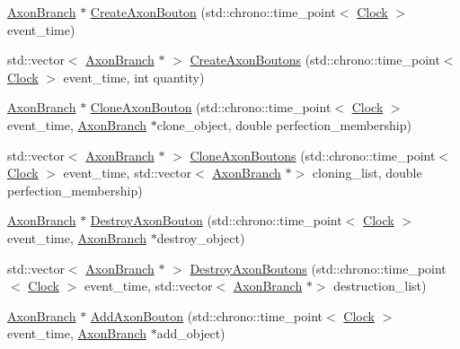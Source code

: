 \begin{DoxyCompactItemize}
\item 
\mbox{\hyperlink{classAxonBranch}{Axon\+Branch}} $\ast$ \mbox{\hyperlink{classAxonBranch_a30b4602e5dd121666478ff9de52d022b}{Create\+Axon\+Bouton}} (std\+::chrono\+::time\+\_\+point$<$ \mbox{\hyperlink{universe_8h_a0ef8d951d1ca5ab3cfaf7ab4c7a6fd80}{Clock}} $>$ event\+\_\+time)
\item 
std\+::vector$<$ \mbox{\hyperlink{classAxonBranch}{Axon\+Branch}} $\ast$ $>$ \mbox{\hyperlink{classAxonBranch_a77e93626a7993f76e689d09721974e90}{Create\+Axon\+Boutons}} (std\+::chrono\+::time\+\_\+point$<$ \mbox{\hyperlink{universe_8h_a0ef8d951d1ca5ab3cfaf7ab4c7a6fd80}{Clock}} $>$ event\+\_\+time, int quantity)
\item 
\mbox{\hyperlink{classAxonBranch}{Axon\+Branch}} $\ast$ \mbox{\hyperlink{classAxonBranch_ae861207a8a0aeb2b60c305b25248e4b9}{Clone\+Axon\+Bouton}} (std\+::chrono\+::time\+\_\+point$<$ \mbox{\hyperlink{universe_8h_a0ef8d951d1ca5ab3cfaf7ab4c7a6fd80}{Clock}} $>$ event\+\_\+time, \mbox{\hyperlink{classAxonBranch}{Axon\+Branch}} $\ast$clone\+\_\+object, double perfection\+\_\+membership)
\item 
std\+::vector$<$ \mbox{\hyperlink{classAxonBranch}{Axon\+Branch}} $\ast$ $>$ \mbox{\hyperlink{classAxonBranch_a842b3875b2771f4b8e7316bfb9af894c}{Clone\+Axon\+Boutons}} (std\+::chrono\+::time\+\_\+point$<$ \mbox{\hyperlink{universe_8h_a0ef8d951d1ca5ab3cfaf7ab4c7a6fd80}{Clock}} $>$ event\+\_\+time, std\+::vector$<$ \mbox{\hyperlink{classAxonBranch}{Axon\+Branch}} $\ast$$>$ cloning\+\_\+list, double perfection\+\_\+membership)
\item 
\mbox{\hyperlink{classAxonBranch}{Axon\+Branch}} $\ast$ \mbox{\hyperlink{classAxonBranch_a024c8666555702ebe67e2a5caf1b866a}{Destroy\+Axon\+Bouton}} (std\+::chrono\+::time\+\_\+point$<$ \mbox{\hyperlink{universe_8h_a0ef8d951d1ca5ab3cfaf7ab4c7a6fd80}{Clock}} $>$ event\+\_\+time, \mbox{\hyperlink{classAxonBranch}{Axon\+Branch}} $\ast$destroy\+\_\+object)
\item 
std\+::vector$<$ \mbox{\hyperlink{classAxonBranch}{Axon\+Branch}} $\ast$ $>$ \mbox{\hyperlink{classAxonBranch_a8c022977e091b8cab367b21c0c4930ea}{Destroy\+Axon\+Boutons}} (std\+::chrono\+::time\+\_\+point$<$ \mbox{\hyperlink{universe_8h_a0ef8d951d1ca5ab3cfaf7ab4c7a6fd80}{Clock}} $>$ event\+\_\+time, std\+::vector$<$ \mbox{\hyperlink{classAxonBranch}{Axon\+Branch}} $\ast$$>$ destruction\+\_\+list)
\item 
\mbox{\hyperlink{classAxonBranch}{Axon\+Branch}} $\ast$ \mbox{\hyperlink{classAxonBranch_a88e6af84b45bb6f6f8900a6d4aec446c}{Add\+Axon\+Bouton}} (std\+::chrono\+::time\+\_\+point$<$ \mbox{\hyperlink{universe_8h_a0ef8d951d1ca5ab3cfaf7ab4c7a6fd80}{Clock}} $>$ event\+\_\+time, \mbox{\hyperlink{classAxonBranch}{Axon\+Branch}} $\ast$add\+\_\+object)

\end{DoxyCompactItemize}
